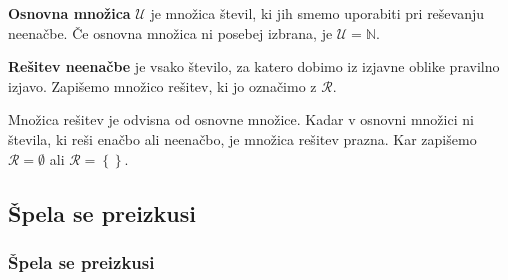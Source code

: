         \begin{frame}[t]
            \begin{alertblock}{}
                \textbf{Osnovna množica} $\mathbf{\mathcal{U}}$ je množica števil, ki jih smemo uporabiti pri reševanju neenačbe. Če osnovna množica ni posebej izbrana, je $\mathcal{U}=\mathbb{N}$. 
            \end{alertblock}

            \begin{alertblock}{}
                \textbf{Rešitev neenačbe} je vsako število, za katero dobimo iz izjavne oblike pravilno izjavo. Zapišemo množico rešitev, ki jo označimo z $\mathbf{\mathcal{R}}$. 
            \end{alertblock}

            \begin{block}{}
                Množica rešitev je odvisna od osnovne množice.
                Kadar v osnovni množici ni števila, ki reši enačbo ali neenačbo, je množica rešitev prazna. Kar zapišemo $\mathcal{R}=\emptyset$ ali $\mathcal{R}=\left\{\right\}$.
            \end{block}
        \end{frame}

        \subsection{Špela se preizkusi}
        
        \begin{frame}[t]
            \frametitle{Špela se preizkusi}
        \end{frame}
